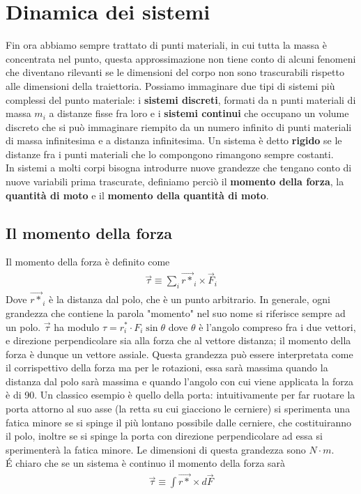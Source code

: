 \documentclass[10pt,a4paper]{article}
\begin{document}
\section{Dinamica dei sistemi}
Fin ora abbiamo sempre trattato di punti materiali, in cui tutta la massa è concentrata nel punto, questa approssimazione non tiene conto di alcuni fenomeni che diventano rilevanti se le dimensioni del corpo non sono trascurabili rispetto alle dimensioni della traiettoria. Possiamo immaginare due tipi di sistemi più complessi del punto materiale: i \textbf{sistemi discreti}, formati da n punti materiali di massa $m_i$ a distanze fisse fra loro e i \textbf{sistemi continui} che occupano un volume discreto che si può immaginare riempito da un numero infinito di punti materiali di massa infinitesima e a distanza infinitesima. Un sistema è detto \textbf{rigido} se le distanze fra i punti materiali che lo compongono rimangono sempre costanti.\\
In sistemi a molti corpi bisogna introdurre nuove grandezze che tengano conto di nuove variabili prima trascurate, definiamo perciò il \textbf{momento della forza}, la \textbf{quantità di moto} e il \textbf{momento della quantità di moto}.
\subsection{Il momento della forza}
Il momento della forza è definito come
\begin{align*}
\vec{\tau} \equiv \sum_i\vec{r*}_i \times \vec{F}_i
\end{align*}
Dove $\vec{r*}_i$ è la distanza dal polo, che è un punto arbitrario. In generale, ogni grandezza che contiene la parola "momento" nel suo nome si riferisce sempre ad un polo. $\vec{\tau}$ ha modulo $\tau = r^*_i\cdot F_i \sin\theta$ dove $\theta$ è l'angolo compreso fra i due vettori, e direzione perpendicolare sia alla forza che al vettore distanza; il momento della forza è dunque un vettore assiale. Questa grandezza può essere interpretata come il corrispettivo della forza ma per le rotazioni, essa sarà massima quando la distanza dal polo sarà massima e quando l'angolo con cui viene applicata la forza è di 90\textdegree. Un classico esempio è quello della porta: intuitivamente per far ruotare la porta attorno al suo asse (la retta su cui giacciono le cerniere) si sperimenta una fatica minore se si spinge il più lontano possibile dalle cerniere, che costituiranno il polo, inoltre se si spinge la porta con direzione perpendicolare ad essa si sperimenterà la fatica minore. Le dimensioni di questa grandezza sono $N\cdot m$.\\
\'{E} chiaro che se un sistema è continuo il momento della forza sarà
\begin{align*}
	\vec{\tau} \equiv \int \vec{r*} \times d\vec{F}
\end{align*}
\end{document}
